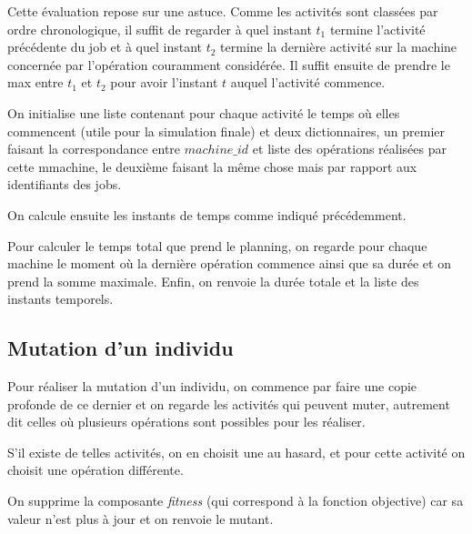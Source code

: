 Cette évaluation repose sur une astuce. Comme les activités sont classées par ordre chronologique, il suffit de regarder à quel instant $t_1$ termine l'activité précédente du job et à quel instant $t_2$ termine la dernière activité sur la machine concernée par l'opération couramment considérée. Il suffit ensuite de prendre le max entre $t_1$ et $t_2$ pour avoir l'instant $t$ auquel l'activité commence.



On initialise une liste contenant pour chaque activité le temps où elles commencent (utile pour la simulation finale) et deux dictionnaires, un premier faisant la correspondance entre $machine\_id$ et liste des opérations réalisées par cette mmachine, le deuxième faisant la même chose mais par rapport aux identifiants des jobs.



On calcule ensuite les instants de temps comme indiqué précédemment.



Pour calculer le temps total que prend le planning, on regarde pour chaque machine le moment où la dernière opération commence ainsi que sa durée et on prend la somme maximale. Enfin, on renvoie la durée totale et la liste des instants temporels.

\subsection{Mutation d'un individu}



Pour réaliser la mutation d'un individu, on commence par faire une copie profonde de ce dernier et on regarde les activités qui peuvent muter, autrement dit celles où plusieurs opérations sont possibles pour les réaliser.



S'il existe de telles activités, on en choisit une au hasard, et pour cette activité on choisit une opération différente. 



On supprime la composante \textit{fitness} (qui correspond à la fonction objective) car sa valeur n'est plus à jour et on renvoie le mutant.

